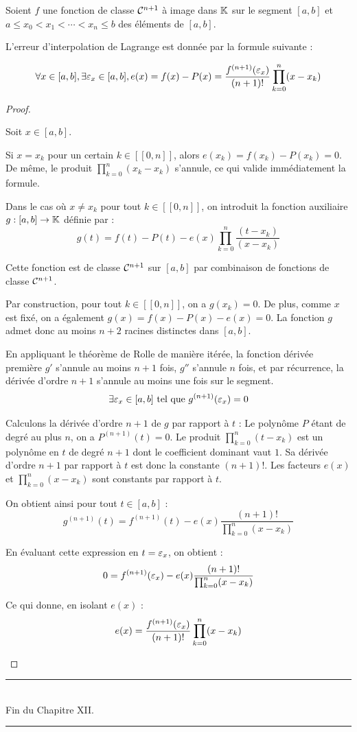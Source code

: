 \documentclass[12pt, a4paper]{report}
\begin{document}
\begin{theorem}
    Soient $f$ une fonction de classe $\mathcal{C}^{n+1}$ à image dans $\mathbb{K}$ sur le segment $[a,b]$ et $a \le x_0 < x_1 < \cdots < x_n \le b$ des éléments de $[a,b]$.

    L'erreur d'interpolation de Lagrange est donnée par la formule suivante :

    $$\forall x \in [a,b], \exists \varepsilon_x \in [a,b], e(x) = f(x) - P(x) = \frac{f^{(n+1)}(\varepsilon_x)}{(n+1)!} \prod_{k=0}^{n} (x-x_k)$$
\end{theorem}

\begin{proof}
    \begin{outline}
    \1 Soit $x \in [a,b]$.

    \1 Si $x = x_k$ pour un certain $k \in [\![0,n]\!]$, alors $e(x_k) = f(x_k) - P(x_k) = 0$. De même, le produit $\prod_{k=0}^n (x_k - x_k)$ s'annule, ce qui valide immédiatement la formule.

    \1 Dans le cas où $x \ne x_k$ pour tout $k \in [\![0,n]\!]$, on introduit la fonction auxiliaire $g : [a,b] \to \mathbb{K}$ définie par :
    $$g(t) = f(t) - P(t) - e(x) \prod_{k=0}^{n} \frac{(t-x_k)}{(x-x_k)}$$

    \2 Cette fonction est de classe $\mathcal{C}^{n+1}$ sur $[a,b]$ par combinaison de fonctions de classe $\mathcal{C}^{n+1}$.

    \2 Par construction, pour tout $k \in [\![0,n]\!]$, on a $g(x_k) = 0$. De plus, comme $x$ est fixé, on a également $g(x) = f(x) - P(x) - e(x) = 0$. La fonction $g$ admet donc au moins $n+2$ racines distinctes dans $[a,b]$.

    \2 En appliquant le théorème de Rolle de manière itérée, la fonction dérivée première $g'$ s'annule au moins $n+1$ fois, $g''$ s'annule $n$ fois, et par récurrence, la dérivée d'ordre $n+1$ s'annule au moins une fois sur le segment.
    $$\exists \varepsilon_x \in [a,b] \text{ tel que } g^{(n+1)}(\varepsilon_x) = 0$$

    \2 Calculons la dérivée d'ordre $n+1$ de $g$ par rapport à $t$ :
    \3 Le polynôme $P$ étant de degré au plus $n$, on a $P^{(n+1)}(t) = 0$.
    \3 Le produit $\prod_{k=0}^{n} (t-x_k)$ est un polynôme en $t$ de degré $n+1$ dont le coefficient dominant vaut $1$. Sa dérivée d'ordre $n+1$ par rapport à $t$ est donc la constante $(n+1)!$.
    \3 Les facteurs $e(x)$ et $\prod_{k=0}^{n} (x-x_k)$ sont constants par rapport à $t$.

    \2 On obtient ainsi pour tout $t \in [a,b]$ :
    $$g^{(n+1)}(t) = f^{(n+1)}(t) - e(x) \frac{(n+1)!}{\prod_{k=0}^{n} (x-x_k)}$$

    \2 En évaluant cette expression en $t = \varepsilon_x$, on obtient :
    $$0 = f^{(n+1)}(\varepsilon_x) - e(x) \frac{(n+1)!}{\prod_{k=0}^{n} (x-x_k)}$$

    \2 Ce qui donne, en isolant $e(x)$ :
    $$e(x) = \frac{f^{(n+1)}(\varepsilon_x)}{(n+1)!} \prod_{k=0}^{n} (x-x_k)$$
    \end{outline}
\end{proof}

\begin{center}
    \rule{0.5\textwidth}{1pt}\\
    Fin du Chapitre XII.\\
    \rule{0.5\textwidth}{1pt}
\end{center}
\end{document}
